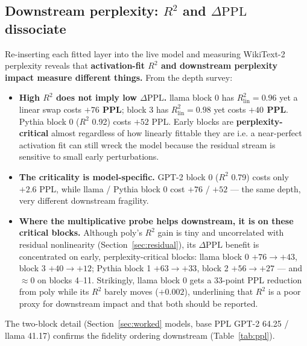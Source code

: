 \documentclass{article}
\newcommand{\Rlin}{R^2_{\mathrm{lin}}}
\newcommand{\dppl}{\Delta\mathrm{PPL}}
\begin{document}
\subsection{Downstream perplexity: \texorpdfstring{$R^2$}{R2} and \texorpdfstring{$\dppl$}{dPPL} dissociate}
\label{sec:ppl}

Re-inserting each fitted layer into the live model and measuring WikiText-2 perplexity reveals
that \textbf{activation-fit $R^2$ and downstream perplexity impact measure different things.}
From the depth survey:
\begin{itemize}
\item \textbf{High $R^2$ does not imply low $\dppl$.} llama block 0 has $\Rlin = 0.96$ yet a
  linear swap costs \textbf{$+76$ PPL}; block 3 has $\Rlin = 0.98$ yet costs \textbf{$+40$ PPL}.
  Pythia block 0 ($R^2$ 0.92) costs $+52$ PPL. Early blocks are \textbf{perplexity-critical}
  almost regardless of how linearly fittable they are i.e. a near-perfect activation fit can still
  wreck the model because the residual stream is sensitive to small early perturbations.
\item \textbf{The criticality is model-specific.} GPT-2 block 0 ($R^2$ 0.79) costs only $+2.6$
  PPL, while llama / Pythia block 0 cost $+76$ / $+52$ --- the same depth, very different
  downstream fragility.
\item \textbf{Where the multiplicative probe helps downstream, it is on these critical blocks.}
  Although poly's \emph{$R^2$} gain is tiny and uncorrelated with residual nonlinearity
  (Section~\ref{sec:residual}), its \emph{$\dppl$} benefit is concentrated on early,
  perplexity-critical blocks: llama block 0 $+76 \to +43$, block 3 $+40 \to +12$; Pythia block 1
  $+63 \to +33$, block 2 $+56 \to +27$ --- and $\approx 0$ on blocks 4--11. Strikingly, llama
  block 0 gets a 33-point PPL reduction from poly while its $R^2$ barely moves ($+0.002$),
  underlining that $R^2$ is a poor proxy for downstream impact and that both should be reported.
\end{itemize}

The two-block detail (Section~\ref{sec:worked} models, base PPL GPT-2 64.25 / llama 41.17)
confirms the fidelity ordering downstream (Table~\ref{tab:ppl}).
\end{document}
